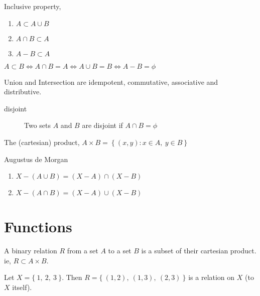 	\begin{remark}Inclusive property,
		\begin{enumerate}
			\item $A \subset A \cup B$
			\item $A \cap B \subset A$
			\item $A-B \subset A$
		\end{enumerate}
	\end{remark}

	\begin{remark}
		$A \subset B \iff A \cap B = A \iff A \cup B = B \iff A - B = \phi$
	\end{remark}

	\begin{remark}
		Union and Intersection are idempotent, commutative, associative and distributive.
	\end{remark}

	\begin{description}
		\item[disjoint] Two sets $A$ and $B$ are disjoint if $A \cap B = \phi$
	\end{description}

	\begin{definition}
		The (cartesian) product, $A \times B =\  \{\ (x,y) : x \in A,\ y \in B\ \}$
	\end{definition}

	\begin{theorem} Augustus de Morgan
		\begin{enumerate}
			\item $X - (A \cup B) = (X-A) \cap (X-B)$
			\item $X - (A \cap B) = (X-A) \cup (X-B)$
		\end{enumerate}
	\end{theorem}

\section{Functions}
	\begin{definition}
		A binary relation $R$ from a set $A$ to a set $B$ is a subset of their cartesian product. ie, $R \subset A \times B$.
	\end{definition}

	\begin{remark}
		Let $X = \{\ 1,\ 2,\ 3\ \}$. Then $R = \{\ (1,2),\ (1,3),\ (2,3)\ \}$ is a relation on $X$ (to $X$ itself).
	\end{remark}

